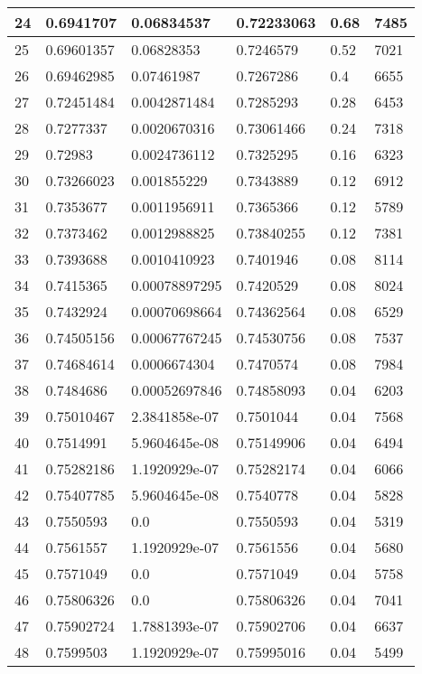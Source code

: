 \begin{longtable}{|l|l|l|l|l|l|}
24 & 0.6941707 & 0.06834537 & 0.72233063 & 0.68 & 7485 \\ \hline 
25 & 0.69601357 & 0.06828353 & 0.7246579 & 0.52 & 7021 \\ \hline 
26 & 0.69462985 & 0.07461987 & 0.7267286 & 0.4 & 6655 \\ \hline 
27 & 0.72451484 & 0.0042871484 & 0.7285293 & 0.28 & 6453 \\ \hline 
28 & 0.7277337 & 0.0020670316 & 0.73061466 & 0.24 & 7318 \\ \hline 
29 & 0.72983 & 0.0024736112 & 0.7325295 & 0.16 & 6323 \\ \hline 
30 & 0.73266023 & 0.001855229 & 0.7343889 & 0.12 & 6912 \\ \hline 
31 & 0.7353677 & 0.0011956911 & 0.7365366 & 0.12 & 5789 \\ \hline 
32 & 0.7373462 & 0.0012988825 & 0.73840255 & 0.12 & 7381 \\ \hline 
33 & 0.7393688 & 0.0010410923 & 0.7401946 & 0.08 & 8114 \\ \hline 
34 & 0.7415365 & 0.00078897295 & 0.7420529 & 0.08 & 8024 \\ \hline 
35 & 0.7432924 & 0.00070698664 & 0.74362564 & 0.08 & 6529 \\ \hline 
36 & 0.74505156 & 0.00067767245 & 0.74530756 & 0.08 & 7537 \\ \hline 
37 & 0.74684614 & 0.0006674304 & 0.7470574 & 0.08 & 7984 \\ \hline 
38 & 0.7484686 & 0.00052697846 & 0.74858093 & 0.04 & 6203 \\ \hline 
39 & 0.75010467 & 2.3841858e-07 & 0.7501044 & 0.04 & 7568 \\ \hline 
40 & 0.7514991 & 5.9604645e-08 & 0.75149906 & 0.04 & 6494 \\ \hline 
41 & 0.75282186 & 1.1920929e-07 & 0.75282174 & 0.04 & 6066 \\ \hline 
42 & 0.75407785 & 5.9604645e-08 & 0.7540778 & 0.04 & 5828 \\ \hline 
43 & 0.7550593 & 0.0 & 0.7550593 & 0.04 & 5319 \\ \hline 
44 & 0.7561557 & 1.1920929e-07 & 0.7561556 & 0.04 & 5680 \\ \hline 
45 & 0.7571049 & 0.0 & 0.7571049 & 0.04 & 5758 \\ \hline 
46 & 0.75806326 & 0.0 & 0.75806326 & 0.04 & 7041 \\ \hline 
47 & 0.75902724 & 1.7881393e-07 & 0.75902706 & 0.04 & 6637 \\ \hline 
48 & 0.7599503 & 1.1920929e-07 & 0.75995016 & 0.04 & 5499 \\ \hline 

\end{longtable}
